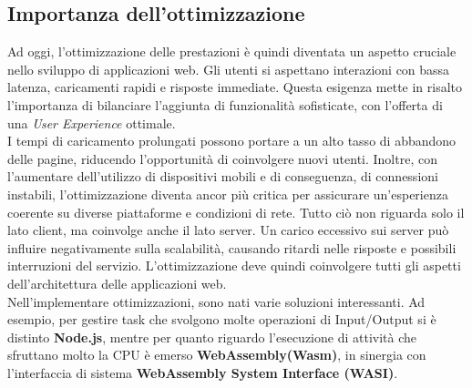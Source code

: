 \subsection{Importanza dell'ottimizzazione}
Ad oggi, l'ottimizzazione delle prestazioni è quindi diventata un aspetto cruciale nello sviluppo di applicazioni web. Gli utenti si aspettano interazioni con bassa latenza, caricamenti rapidi e risposte immediate. Questa esigenza mette in risalto l'importanza di bilanciare l'aggiunta di funzionalità sofisticate, con l'offerta di una \emph{User Experience} ottimale.
\\I tempi di caricamento prolungati possono portare a un alto tasso di abbandono delle pagine, riducendo l'opportunità di coinvolgere nuovi utenti. Inoltre, con l'aumentare dell'utilizzo di dispositivi mobili e di conseguenza, di connessioni instabili, l'ottimizzazione diventa ancor più critica per assicurare un'esperienza coerente su diverse piattaforme e condizioni di rete.
Tutto ciò non riguarda solo il lato client, ma coinvolge anche il lato server. Un carico eccessivo sui server può influire negativamente sulla scalabilità, causando ritardi nelle risposte e possibili interruzioni del servizio. L'ottimizzazione deve quindi coinvolgere tutti gli aspetti dell'architettura delle applicazioni web.
\\Nell'implementare ottimizzazioni, sono nati varie soluzioni interessanti. Ad esempio, per gestire task che svolgono molte operazioni di Input/Output si è distinto \textbf{Node.js}, mentre per quanto riguardo l'esecuzione di attività che sfruttano molto la CPU è emerso \textbf{WebAssembly(Wasm)}, in sinergia con l'interfaccia di sistema \textbf{WebAssembly System Interface (WASI)}.

\newpage
